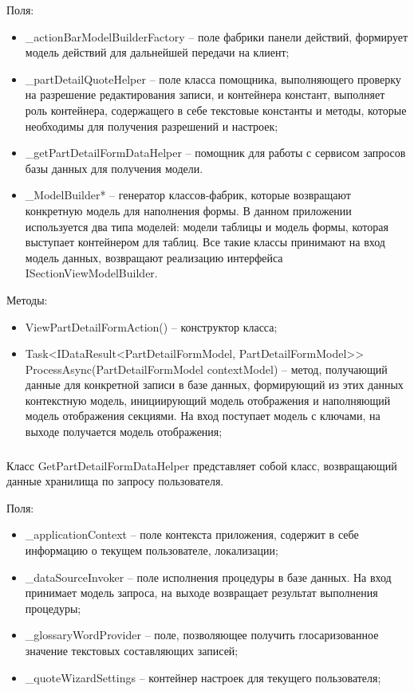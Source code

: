Поля:
\begin{itemize}
  \item \_actionBarModelBuilderFactory – поле фабрики панели действий, формирует модель действий для дальнейшей передачи на клиент;
  \item \_partDetailQuoteHelper – поле класса помощника, выполняющего проверку на разрешение редактирования записи, и контейнера констант, выполняет роль контейнера, содержащего в себе текстовые константы и методы, которые необходимы для получения разрешений и настроек;
  \item \_getPartDetailFormDataHelper – помощник для работы с сервисом запросов базы данных для получения модели.
  \item \_ModelBuilder* – генератор классов-фабрик, которые возвращают конкретную модель для наполнения формы. В данном приложении используется два типа моделей: модели таблицы и модель формы, которая выступает контейнером для таблиц. Все такие классы принимают на вход модель данных, возвращают реализацию интерфейса ISectionViewModelBuilder.
\end{itemize}

Методы:
\begin{itemize}
  \item ViewPartDetailFormAction() – конструктор класса;
  \item Task<IDataResult<PartDetailFormModel, PartDetailFormModel>> \foreignlanguage{english}{ProcessAsync(PartDetailFormModel contextModel)} – метод, получающий данные для конкретной записи в базе данных, формирующий из этих данных контекстную модель, инициирующий модель отображения и наполняющий модель отображения секциями. На вход поступает модель с ключами, на выходе получается модель отображения;
\end{itemize}

\subsubsection{}
\label{sub:arch_and_mod:data_layer:view_part_detail}

Класс GetPartDetailFormDataHelper представляет собой класс, возвращающий данные хранилища по запросу пользователя.

Поля:
\begin{itemize}
  \item \_applicationContext – поле контекста приложения, содержит в себе информацию о текущем пользователе, локализации;
  \item \_dataSourceInvoker – поле исполнения процедуры в базе данных. На вход принимает модель запроса, на выходе возвращает результат выполнения процедуры;
  \item \_glossaryWordProvider – поле, позволяющее получить глосаризованное значение текстовых составляющих записей;
  \item \_quoteWizardSettings – контейнер настроек для текущего пользователя;
\end{itemize}

